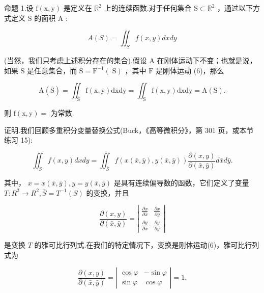 命题 1.设 \(\mathrm{f}\left( {\mathrm{x},\mathrm{y}}\right)\) 是定义在 \({\mathbb{R}}^{2}\) 上的连续函数.对于任何集合 \(\mathrm{S} \subset  {\mathbb{R}}^{2}\) ，通过以下方式定义 \(\mathrm{S}\) 的面积 \(\mathrm{A}\) :

\[
A\left( S\right)  = {\iint }_{S}f\left( {x,y}\right) {dxdy}
\]

(当然，我们只考虑上述积分存在的集合).假设 \(\mathrm{A}\) 在刚体运动下不变；也就是说，如果 \(\mathrm{S}\) 是任意集合，而 \(\overline{\mathrm{S}} = {\mathrm{F}}^{-1}\left( \mathrm{\;S}\right)\) ，其中 \(\mathrm{F}\) 是刚体运动 (6)，那么

\[
\mathrm{A}\left( \overline{\mathrm{S}}\right)  = {\iint }_{\overline{\mathrm{S}}}\mathrm{f}\left( {\overline{\mathrm{x}},\overline{\mathrm{y}}}\right) \mathrm{d}\overline{\mathrm{x}}\mathrm{d}\overline{\mathrm{y}} = {\iint }_{\mathrm{S}}\mathrm{f}\left( {\mathrm{x},\mathrm{y}}\right) \mathrm{{dx}}\mathrm{{dy}} = \mathrm{A}\left( \mathrm{S}\right) .
\]

则 \(\mathrm{f}\left( {\mathrm{x},\mathrm{y}}\right)  =\) 为常数.

证明.我们回顾多重积分变量替换公式(Buck，《高等微积分》，第 301 页，或本节练习 15):

\[
{\iint }_{S}f\left( {x,y}\right) {dxdy} = {\iint }_{\bar{S}}f\left( {x\left( {\bar{x},\bar{y}}\right) ,y\left( {\bar{x},\bar{y}}\right) }\right) \frac{\partial \left( {x,y}\right) }{\partial \left( {\bar{x},\bar{y}}\right) }d\bar{x}d\bar{y}. \tag{7}
\]

其中， \(x = x\left( {\bar{x},\bar{y}}\right) ,y = y\left( {\bar{x},\bar{y}}\right)\) 是具有连续偏导数的函数，它们定义了变量 \(T : {R}^{2} \rightarrow  {R}^{2},\bar{S} = {T}^{-1}\left( S\right)\) 的变换，并且

\[
\frac{\partial \left( {x,y}\right) }{\partial \left( {\bar{x},\bar{y}}\right) } = \left| \begin{array}{ll} \frac{\partial x}{\partial \bar{x}} & \frac{\partial x}{\partial \bar{y}} \\  \frac{\partial y}{\partial \bar{x}} & \frac{\partial y}{\partial \bar{y}} \end{array}\right|
\]

是变换 \(T\) 的雅可比行列式.在我们的特定情况下，变换是刚体运动(6)，雅可比行列式为

\[
\frac{\partial \left( {x,y}\right) }{\partial \left( {\bar{x},\bar{y}}\right) } = \left| \begin{array}{rr} \cos \varphi &  - \sin \varphi \\  \sin \varphi & \cos \varphi  \end{array}\right|  = 1.
\]

